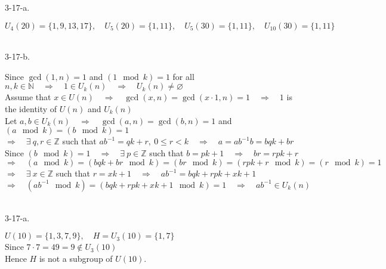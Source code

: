 \documentclass[12pt]{book}
\begin{document}
\begin{CJK}{UTF8}{bsmi}
3-17-a. \begin{minipage}[t]{\dimexpr\linewidth-2em}
$U_4(20)=\{1,9,13,17\},\quad U_5(20)=\{1,11\},\quad U_5(30)=\{1,11\},\quad U_{10}(30)=\{1,11\}$ \\
\end{minipage}\\

3-17-b. \begin{minipage}[t]{\dimexpr\linewidth-2em}
Since $\gcd(1, n)=1$ and $(1\mod k)=1$ for all $n,k\in\mathbb{N}\quad\Rightarrow\quad 1\in U_k(n)\quad\Rightarrow\quad U_k(n)\ne\varnothing$ \\
Assume that $x\in U(n)\quad\Rightarrow\quad\gcd(x, n)=\gcd(x\cdot1, n)=1\quad\Rightarrow\quad 1$ is the identity of $U(n)$ and $U_k(n)$ \\
Let $a,b\in U_k(n)\quad\Rightarrow\quad\gcd(a,n)=\gcd(b,n)=1$ and $(a\mod k)=(b\mod k)=1$ \\
$\Rightarrow\quad\exists\ q,r\in\mathbb{Z}$ such that $ab^{-1}=qk+r,\ 0\le r<k\quad\Rightarrow\quad a=ab^{-1}b=bqk+br$ \\
Since $(b\mod k)=1\quad\Rightarrow\quad\exists\ p\in\mathbb{Z}$ such that $b=pk+1\quad\Rightarrow\quad br=rpk+r$ \\
$\Rightarrow\quad (a\mod k)=(bqk+br\mod k)=(br\mod k)=(rpk+r\mod k)=(r\mod k)=1$ \\
$\Rightarrow\quad\exists\ x\in\mathbb{Z}$ such that $r=xk+1\quad\Rightarrow\quad ab^{-1}=bqk+rpk+xk+1$ \\
$\Rightarrow\quad (ab^{-1}\mod k)=(bqk+rpk+xk+1\mod k)=1\quad\Rightarrow\quad ab^{-1}\in U_k(n)$
\end{minipage}\\

3-17-a. \begin{minipage}[t]{\dimexpr\linewidth-2em}
$U(10)=\{1,3,7,9\},\quad H=U_3(10)=\{1,7\}$ \\
Since $7\cdot7=49=9\notin U_3(10)$ \\
Hence $H$ is not a subgroup of $U(10)$.
\end{minipage}\\

\end{CJK}
\end{document}

